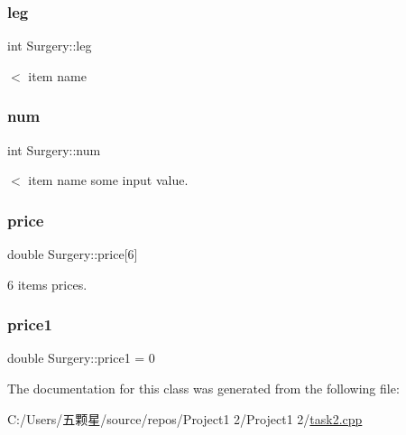 \subsubsection{\texorpdfstring{leg}{leg}}
{\footnotesize\ttfamily int Surgery\+::leg\hspace{0.3cm}{\ttfamily [private]}}

$<$ item name \mbox{\label{class_surgery_a53f95bd6143864c3ee719489f9088353}} 
\subsubsection{\texorpdfstring{num}{num}}
{\footnotesize\ttfamily int Surgery\+::num\hspace{0.3cm}{\ttfamily [private]}}

$<$ item name some input value. \mbox{\label{class_surgery_a0edac271925672c2896ade9005c11c78}} 
\subsubsection{\texorpdfstring{price}{price}}
{\footnotesize\ttfamily double Surgery\+::price\mbox{[}6\mbox{]}\hspace{0.3cm}{\ttfamily [private]}}

6 items prices. \mbox{\label{class_surgery_a93e4e574bc62aa12ca4236c88f6ec3b2}} 
\subsubsection{\texorpdfstring{price1}{price1}}
{\footnotesize\ttfamily double Surgery\+::price1 = 0\hspace{0.3cm}{\ttfamily [private]}}



The documentation for this class was generated from the following file\+:\begin{DoxyCompactItemize}
\item 
C\+:/\+Users/五颗星/source/repos/\+Project1 2/\+Project1 2/\mbox{\hyperlink{task2_8cpp}{task2.\+cpp}}\end{DoxyCompactItemize}
